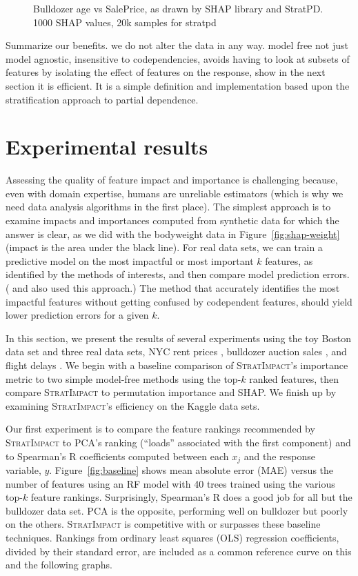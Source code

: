 \documentclass[11pt]{article}
\newcommand{\figref}[1]{Figure~\ref{#1}}
\newcommand{\todo}[1]{{{\color{red}{[#1]}}}}
\newcommand{\simp}{\fontfamily{cmr}\textsc{\small StratImpact}}
\begin{document}
\begin{figure}[htbp]
\begin{center}
\caption{\small Bulldozer age vs SalePrice, as drawn by SHAP library and StratPD. 1000 SHAP values, 20k samples for stratpd}
\label{fig:shap-stratpd-YearMade}
\end{center}
\end{figure}

Summarize our benefits. we do not alter the data in any way. model free not just model agnostic, insensitive to codependencies, avoids having to look at subsets of features by isolating the effect of features on the response, show in the next section it is efficient. It is a simple definition and implementation based upon the stratification approach to partial dependence. 

\section{Experimental results}\label{sec:experiments}

Assessing the quality of feature impact and importance is challenging because, even with domain expertise, humans are unreliable estimators (which is why we need data analysis algorithms in the first place).  The simplest approach is to examine impacts and importances computed from synthetic data for which the answer is clear, as we did with the bodyweight data in \figref{fig:shap-weight} (impact is the area under the black line).  For real data sets, we can train a predictive model on the most impactful or most important $k$ features, as identified by the methods of interests, and then compare model prediction errors. (\citealt{mRMR} and \citealt{tsanas} also used this approach.) The method that accurately identifies the most impactful features without getting confused by codependent features, should yield lower prediction errors for a given $k$. 

In this section, we present the results of several experiments using the toy Boston data set and three real data sets, NYC rent prices \citep{rent}, bulldozer auction sales \citep{bulldozer}, and flight delays \citep{flights}. We begin with a baseline comparison of \simp{}'s importance metric to two simple model-free methods using the top-$k$ ranked features, then compare \simp{} to permutation importance and SHAP. We finish up by examining \simp's efficiency on the Kaggle data sets.

Our first experiment is to compare the feature rankings recommended by \simp{} to PCA's ranking (``loads'' associated with the first component) and to Spearman's R coefficients computed between each $x_j$ and the response variable, $y$. \figref{fig:baseline} shows mean absolute error  (MAE) versus the number of features using an RF model with 40 trees trained using the various top-$k$ feature rankings. Surprisingly, Spearman's R does a good job for all but the bulldozer data set. PCA is the opposite, performing well on bulldozer but poorly on the others. \simp{} is competitive with or surpasses these baseline techniques.  Rankings from ordinary least squares (OLS) regression coefficients, divided by their standard error, are included as a common reference curve on this and the following graphs. \todo{25k records, 80/20 split, 40 trees etc..., 10 runs, 5-fold CV}
\end{document}
